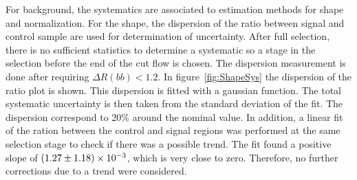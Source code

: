 \begin{table*}[htbH]
\begin{center}
\end{center}
\caption{Summary of uncertainties for signal samples. In addition, all mass points have 2.6\% uncertainty from luminosity measurement.\label{tab:sys}}
\end{table*}

For background, the systematics are associated to estimation methods for shape and normalization. For the shape, the dispersion of the ratio between signal and control sample are used for determination of uncertainty. After full selection, there is no sufficient statistics to determine a systematic so a stage in the selection before the end of the cut flow is chosen. The dispersion measurement is done after requiring $\Delta R(bb) <1.2$. In figure~\ref{fig:ShapeSys} the dispersion of the ratio plot is shown. This dispersion is fitted with a gaussian function. The total systematic uncertainty is then taken from the standard deviation of the fit. The dispersion correspond to 20\% around the nominal value. In addition, a linear fit of the ration between the control and signal regions was performed at the same selection stage to check if there was a possible trend. The fit found a positive slope of $(1.27\pm1.18)\times 10^{-3}$, which is very close to zero. Therefore, no further corrections due to a trend were considered. 

